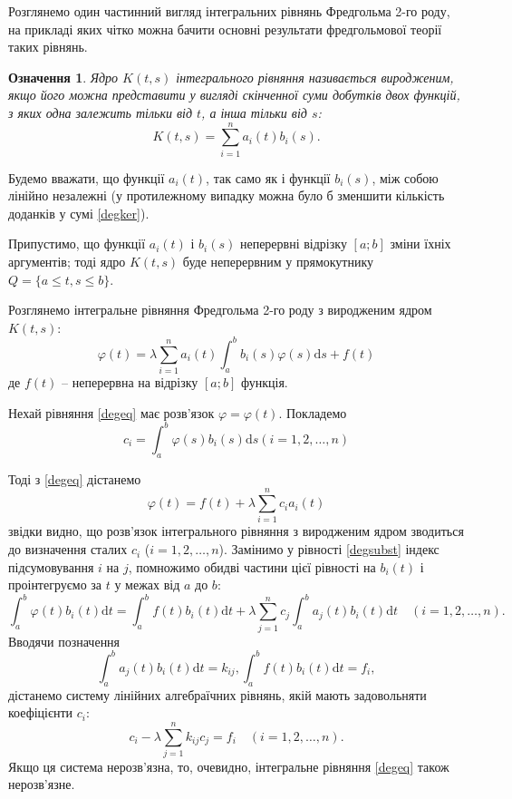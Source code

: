 \documentclass[14pt,twoside]{extreport}
\theoremstyle{mystyle}
\newtheorem{dfn}{Означення}
\numberwithin{equation}{chapter}
\begin{document}
Розглянемо один частинний вигляд інтегральних рівнянь Фредгольма 2-го роду, на прикладі яких чітко можна бачити основні результати фредгольмової теорії таких рівнянь.
\begin{dfn} Ядро $K(t, s)$ інтегрального рівняння називається виродженим, якщо його можна представити у вигляді скінченної суми добутків двох функцій, з яких одна залежить тільки від $t$, а інша тільки від $s$:
\begin{equation}\label{degker}
 K(t, s)=\sum_{i=1}^{n}a_{i}(t)b_{i}(s).
\end{equation}
\end{dfn}

Будемо вважати, що функції $a_i(t)$, так само як і функції $b_i(s)$, між собою лінійно незалежні (у протилежному випадку можна було б зменшити кількість доданків у сумі \eqref{degker}).

Припустимо, що функції $a_i(t)$ і $b_i(s)$ неперервні відрізку $[a; b]$ зміни їхніх аргументів; тоді ядро $K(t, s)$ буде неперервним у прямокутнику $Q=\{a\leqslant t, s \leqslant b\}$.

Розглянемо інтегральне рівняння Фредгольма 2-го роду з виродженим ядром $K(t, s)$:
\begin{equation}\label{degeq}
 \displaystyle \varphi(t)=\lambda\sum_{i=1}^{n}a_{i}(t)\int_{a}^{b}b_{i}(s)\varphi(s)\mathrm{d}s+f(t)
\end{equation}
де $f(t)$ -- неперервна на відрізку $[a; b]$ функція.

Нехай рівняння \eqref{degeq} має розв'язок $\varphi = \varphi(t)$. Покладемо
\begin{equation}\label{c_i}
 c_{i}=\displaystyle \int_{a}^{b}\varphi(s)b_{i}(s)\mathrm{d}s (i=1, 2, \ldots, n)
\end{equation}

Тоді з \eqref{degeq} дістанемо
\begin{equation}\label{degsubst}
\varphi(t)=f(t)+\lambda\sum_{i=1}^{n}c_{i}a_{i}(t)
\end{equation}
звідки видно, що розв'язок інтегрального рівняння з виродженим ядром зводиться до визначення сталих $c_i$ ($i = 1, 2, \ldots, n$). Замінимо у рівності \eqref{degsubst} індекс підсумовування $i$ на $j$, помножимо обидві частини цієї рівності на $b_i(t)$ і проінтегруємо за $t$ у межах від $a$ до $b$:
\begin{equation}\label{substint}
  \displaystyle\int_{a}^{b}\varphi(t)b_{i}(t)\mathrm{d}t=\int_{a}^{b}f(t)b_{i}(t)\mathrm{d}t+ \lambda\sum_{j=1}^{n}c_{j}\int_{a}^{b}a_{j}(t)b_{i}(t)\mathrm{d}t \quad (i=1, 2, \ldots, n).
\end{equation}
Вводячи позначення
\[
 \int_{a}^{b}a_{j}(t)b_{i}(t)\mathrm{d}t=k_{ij}, \displaystyle \int_{a}^{b}f(t)b_{i}(t)\mathrm{d}t=f_{i},
\]
дістанемо систему лінійних алгебраїчних рівнянь, якій мають задовольняти коефіцієнти $c_i$:
\begin{equation}\label{sysc_i}
 c_{i} - \lambda\sum_{j=1}^{n}k_{ij}c_{j}=f_{i}\quad (i=1, 2, \ldots, n).
\end{equation}
Якщо ця система нерозв'язна, то, очевидно, інтегральне рівняння \eqref{degeq} також нерозв'язне.
\end{document}
